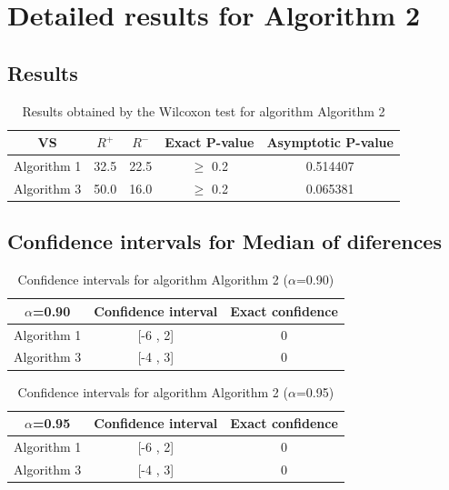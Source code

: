 \documentclass[a4paper,10pt]{article}
\begin{document}
 \clearpage 


\section{Detailed results for Algorithm 2}


\subsection{Results}

\begin{table}[!htp]
\centering\small
\begin{tabular}{
|c|c|c|c|c|}
\hline
 VS & $R^{+}$ & $R^{-}$ & Exact P-value & Asymptotic P-value \\ \hline 
Algorithm 1 & 32.5 & 22.5 & $\geq$ 0.2 & 0.514407\\ \hline 
Algorithm 3 & 50.0 & 16.0 & $\geq$ 0.2 & 0.065381\\ \hline 

\end{tabular}
\caption{Results obtained by the Wilcoxon test for algorithm Algorithm 2}
\end{table}

\subsection{Confidence intervals for Median of diferences}

\begin{table}[!htp]
\centering\small
\begin{tabular}{
|c|c|c|}
\hline
 $\alpha$=0.90 & Confidence interval & Exact confidence \\ \hline 
Algorithm 1 & [-6 , 2] & 0\\ \hline 
Algorithm 3 & [-4 , 3] & 0\\ \hline 

\end{tabular}
\caption{Confidence intervals for algorithm Algorithm 2 ($\alpha$=0.90)}
\end{table}
\begin{table}[!htp]
\centering\small
\begin{tabular}{
|c|c|c|}
\hline
 $\alpha$=0.95 & Confidence interval & Exact confidence \\ \hline 
Algorithm 1 & [-6 , 2] & 0\\ \hline 
Algorithm 3 & [-4 , 3] & 0\\ \hline 

\end{tabular}
\caption{Confidence intervals for algorithm Algorithm 2 ($\alpha$=0.95)}
\end{table}
\end{document}
